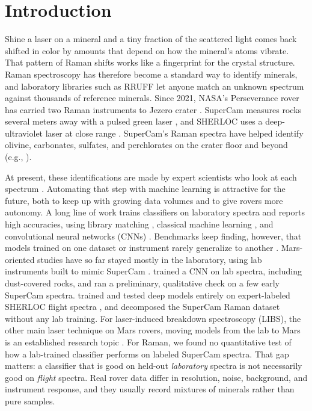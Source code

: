 \section{Introduction}
\label{sec:intro}

Shine a laser on a mineral and a tiny fraction of the scattered light comes back shifted in color by amounts that depend on how the mineral's atoms vibrate. That pattern of Raman shifts works like a fingerprint for the crystal structure. Raman spectroscopy has therefore become a standard way to identify minerals, and laboratory libraries such as RRUFF \citep{lafuente2015rruff} let anyone match an unknown spectrum against thousands of reference minerals. Since 2021, NASA's Perseverance rover has carried two Raman instruments to Jezero crater \citep{farley2020mars2020}. SuperCam measures rocks several meters away with a pulsed green laser \citep{maurice2021supercam,wiens2021supercam}, and SHERLOC uses a deep-ultraviolet laser at close range \citep{bhartia2021sherloc}. SuperCam's Raman spectra have helped identify olivine, carbonates, sulfates, and perchlorates on the crater floor and beyond (e.g., \citep{farley2022aqueously,liu2022olivine,wiens2022stratified,beyssac2023seitah,clave2023carbonate,lopezreyes2025supercam}).

At present, these identifications are made by expert scientists who look at each spectrum \citep{jpl2026supercamsis}. Automating that step with machine learning is attractive for the future, both to keep up with growing data volumes and to give rovers more autonomy. A long line of work trains classifiers on laboratory spectra and reports high accuracies, using library matching \citep{carey2015machine,berrada2025ramanmatch}, classical machine learning \citep{ishikawa2013automated,jahoda2021machine}, and convolutional neural networks (CNNs) \citep{liu2017deep,soysal2025reevaluating}. Benchmarks keep finding, however, that models trained on one dataset or instrument rarely generalize to another \citep{koddenbrock2026ramanbench,sineesh2026benchmarking,qin2026perturbation}. Mars-oriented studies have so far stayed mostly in the laboratory, using lab instruments built to mimic SuperCam \citep{manrique2024simulcam,veneranda2023chemometrics,veneranda2023carbonate,julvegonzalez2023machine,johnsen2025dualband}. \citet{berlanga2022cnn} trained a CNN on lab spectra, including dust-covered rocks, and ran a preliminary, qualitative check on a few early SuperCam spectra. \citet{wang2026sherloc} trained and tested deep models entirely on expert-labeled SHERLOC flight spectra \citep{corpolongo2023sherloc}, and \citet{clave2024unsupervised} decomposed the SuperCam Raman dataset without any lab training. For laser-induced breakdown spectroscopy (LIBS), the other main laser technique on Mars rovers, moving models from the lab to Mars is an established research topic \citep{cui2025libs}. For Raman, we found no quantitative test of how a lab-trained classifier performs on labeled SuperCam spectra. That gap matters: a classifier that is good on held-out \emph{laboratory} spectra is not necessarily good on \emph{flight} spectra. Real rover data differ in resolution, noise, background, and instrument response, and they usually record mixtures of minerals rather than pure samples.

